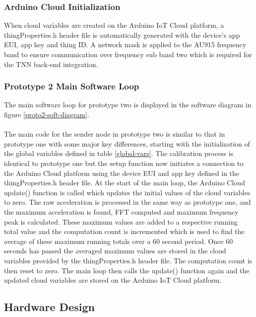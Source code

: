 \subsubsection{Arduino Cloud Initialization}
When cloud variables are created on the Arduino IoT Cloud platform, a thingProperties.h header file is automatically generated with the device's app EUI, app key and thing ID. A network mask is applied to the AU915 frequency band to ensure communication over frequency sub band two which is required for the TNN back-end integration. 

\subsubsection{Prototype 2 Main Software Loop}
The main software loop for prototype two is displayed in the software diagram in figure \ref{proto2-soft-diagram}.\\\\
The main code for the sender node in prototype two is similar to that in prototype one with some major key differences, starting with the initialization of the global variables defined in table \ref{global-vars}. The calibration process is identical to prototype one but the setup function now initiates a connection to the Arduino Cloud platform using the device EUI and app key defined in the thingProperties.h header file. At the start of the main loop, the Arduino Cloud update() function is called which updates the initial values of the cloud variables to zero. The raw acceleration is processed in the same way as prototype one, and the maximum acceleration is found, FFT computed and maximum frequency peak is calculated. These maximum values are added to a respective running total value and the computation count is incremented which is used to find the average of these maximum running totals over a 60 second period. Once 60 seconds has passed the averaged maximum values are stored in the cloud variables provided by the thingProperties.h header file. The computation count is then reset to zero. The main loop then calls the update() function again and the updated cloud variables are stored on the Arduino IoT Cloud platform. 

\subsection{Hardware Design}

